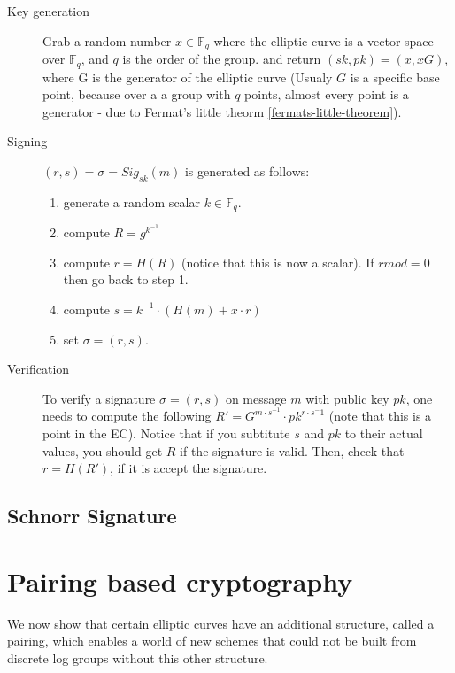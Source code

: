 \begin{description}
  \item[Key generation] Grab a random number $x\in \mathbb{F}_q$ where the elliptic curve  
  is a vector space over $\mathbb{F}_q$, and $q$ is the order of the group.
  and return $(sk,pk)=(x,xG)$, where G is the generator of the elliptic curve 
  (Usualy $G$ is a specific base point, because over a a group with $q$ points, 
  almost every point is a generator - due to Fermat's little theorm \ref{fermats-little-theorem}).
  \item[Signing] $(r,s)=\sigma = Sig_{sk}(m)$ is generated as follows:
  \begin{enumerate}
    \item generate a random scalar $k\in \mathbb{F}_q$.
    \item compute $R=g^{k^{-1}}$
    \item compute $r=H(R)$ (notice that this is now a scalar).
    If $r mod=0$ then go back to step 1.
    \item compute $s=k^{-1}\cdot(H(m)+x\cdot r)$
    \item set $\sigma=(r,s)$.
  \end{enumerate}
  \item[Verification] To verify a signature $\sigma=(r,s)$ on message $m$ with 
  public key $pk$, one needs to compute the following 
  $ R'= G^{m\cdot s^{-1}}\cdot pk^{r\cdot s^-1} $ (note that this is a point in the EC).
  Notice that if you subtitute $s$ and $pk$ to their actual values, you should get $R$ if 
  the signature is valid.
  Then, check that $r=H(R')$, if it is accept the signature.
\end{description}

\subsection{Schnorr Signature}
\section{Pairing based cryptography}
We now show that certain elliptic curves have an additional structure,
called a pairing, which enables a world of new schemes that could not be built
 from discrete log groups without this other structure.

